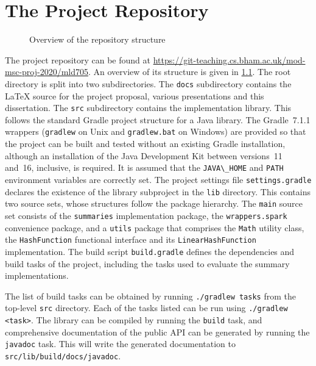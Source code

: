 \chapter{The Project Repository}
\label{app:repository}

\begin{figure}
  \centering
  \caption{Overview of the repository structure}
  \label{fig:respostiory-structure}
\end{figure}

The project repository can be found at \url{https://git-teaching.cs.bham.ac.uk/mod-msc-proj-2020/mld705}.
An overview of its structure is given in \cref{fig:respostiory-structure}.
The root directory is split into two subdirectories.
The \lstinline{docs} subdirectory contains the \LaTeX{} source for the project proposal, various presentations and this dissertation.
The \lstinline{src} subdirectory contains the implementation library.
This follows the standard Gradle project structure for a Java library.
The Gradle~7.1.1 wrappers (\lstinline{gradlew} on Unix and \lstinline{gradlew.bat} on Windows) are provided so that the project can be built and tested without an existing Gradle installation, although an installation of the Java Development Kit between versions~11 and~16, inclusive, is required.
It is assumed that the \lstinline{JAVA\_HOME} and \lstinline{PATH} environment variables are correctly set.
The project settings file \lstinline{settings.gradle} declares the existence of the library subproject in the \lstinline{lib} directory.
This contains two source sets, whose structures follow the package hierarchy.
The \lstinline{main} source set consists of the \lstinline{summaries} implementation package, the \lstinline{wrappers.spark} convenience package, and a \lstinline{utils} package that comprises the \lstinline{Math} utility class, the \lstinline{HashFunction} functional interface and its \lstinline{LinearHashFunction} implementation.
The build script \lstinline{build.gradle} defines the dependencies and build tasks of the project, including the tasks used to evaluate the summary implementations.

The list of build tasks can be obtained by running \lstinline{./gradlew tasks} from the top-level \lstinline{src} directory.
Each of the tasks listed can be run using \lstinline{./gradlew <task>}.
The library can be compiled by running the \lstinline{build} task, and comprehensive documentation of the public API can be generated by running the \lstinline{javadoc} task.
This will write the generated documentation to \lstinline{src/lib/build/docs/javadoc}.

